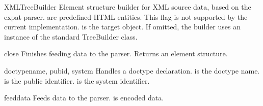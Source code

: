 \begin{classdesc}{XMLTreeBuilder}{ }
Element structure builder for XML source data, based on the
expat parser.
 are predefined HTML entities.  This flag is not supported
by the current implementation.
 is the target object.  If omitted, the builder uses an
instance of the standard TreeBuilder class.
\end{classdesc}

\begin{methoddesc}{close}{}
Finishes feeding data to the parser.
Returns an element structure.
\end{methoddesc}

\begin{methoddesc}{doctype}{name, pubid, system}
Handles a doctype declaration.
 is the doctype name.
 is the public identifier.
 is the system identifier.
\end{methoddesc}

\begin{methoddesc}{feed}{data}
Feeds data to the parser.
 is encoded data.
\end{methoddesc}
